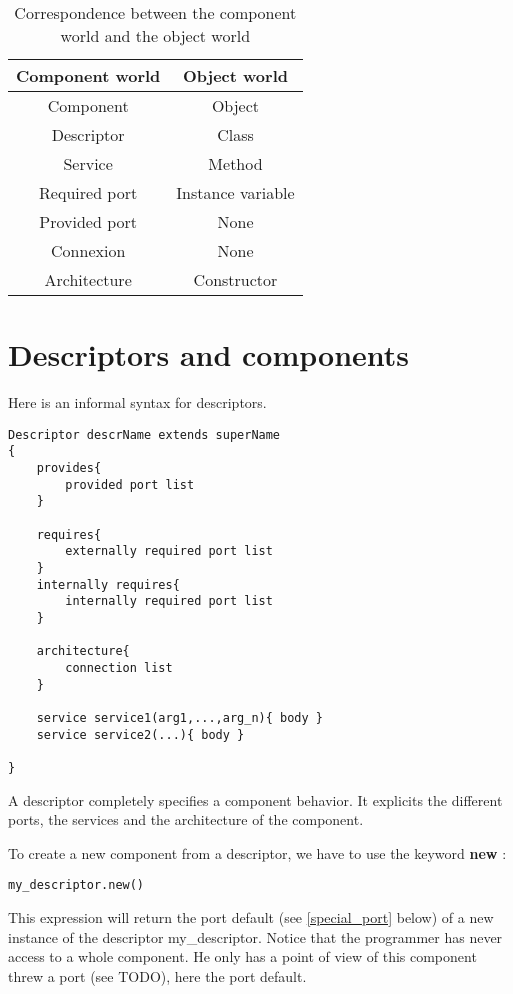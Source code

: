 \begin{table}[!ht]
\begin{center}
\begin{tabular}{|c|c|}
\hline
\textbf{Component world}&\textbf{Object world}\\
\hline
Component & Object \\
Descriptor & Class \\
Service & Method \\
Required port & Instance variable \\
Provided port & None \\
Connexion & None\\
Architecture & Constructor\\
\hline
\end{tabular}
\end{center}
\caption{Correspondence between the component world and the object world}
\end{table}

\section{Descriptors and components}
Here is an informal syntax for descriptors.
\begin{lstlisting}
Descriptor descrName extends superName
{
	provides{
		provided port list
	}
	
	requires{
		externally required port list
	}
	internally requires{
		internally required port list
	}
	
	architecture{
		connection list
	}
	
	service service1(arg1,...,arg_n){ body }
	service service2(...){ body }
	
}

\end{lstlisting}

A descriptor completely specifies a component behavior. It explicits the different ports, the services and the architecture of the component. 

To create a new component from a descriptor, we have to use the keyword \textbf{new} : 
\begin{lstlisting}
my_descriptor.new()
\end{lstlisting}
This expression will return the port \textsf{default} (see \ref{special_port} below) of a new instance of the descriptor \textsf{my\_descriptor}. Notice that the programmer has never access to a whole component. He only has a point of view of this component threw a port (see TODO), here the port \textsf{default}.


